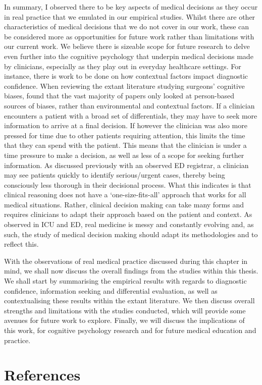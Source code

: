 \documentclass[a4paper, nobind]{templates/ociamthesis}
\begin{document}
\hfill\break
In summary, I observed there to be key aspects of medical decisions as they occur in real practice that we emulated in our empirical studies. Whilst there are other characteristics of medical decisions that we do not cover in our work, these can be considered more as opportunities for future work rather than limitations with our current work. We believe there is sizeable scope for future research to delve even further into the cognitive psychology that underpin medical decisions made by clinicians, especially as they play out in everyday healthcare settings. For instance, there is work to be done on how contextual factors impact diagnostic confidence. When reviewing the extant literature studying surgeons' cognitive biases, \autocite{armstrong_cognitive_2023} found that the vast majority of papers only looked at person-based sources of biases, rather than environmental and contextual factors. If a clinician encounters a patient with a broad set of differentials, they may have to seek more information to arrive at a final decision. If however the clinician was also more pressed for time due to other patients requiring attention, this limits the time that they can spend with the patient. This means that the clinician is under a time pressure to make a decision, as well as less of a scope for seeking further information. As discussed previously with an observed ED registrar, a clinician may see patients quickly to identify serious/urgent cases, thereby being consciously less thorough in their decisional process. What this indicates is that clinical reasoning does not have a `one-size-fits-all' approach that works for all medical situations. Rather, clinical decision making can take many forms and requires clinicians to adapt their approach based on the patient and context. As observed in ICU and ED, real medicine is messy and constantly evolving and, as such, the study of medical decision making should adapt its methodologies and to reflect this.

\hfill\break
With the observations of real medical practice discussed during this chapter in mind, we shall now discuss the overall findings from the studies within this thesis. We shall start by summarising the empirical results with regards to diagnostic confidence, information seeking and differential evaluation, as well as contextualising these results within the extant literature. We then discuss overall strengths and limitations with the studies conducted, which will provide some avenues for future work to explore. Finally, we will discuss the implications of this work, for cognitive psychology research and for future medical education and practice.


\newpage
\section{References}

\setlength{\baselineskip}{0pt} %

{\renewcommand*\MakeUppercase[1]{#1}%
\printbibliography[heading=none]}
\end{document}
